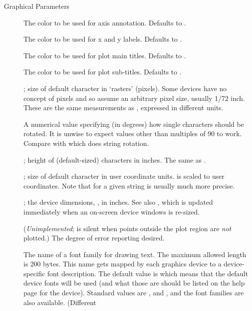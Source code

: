 \begin{Section}{Graphical Parameters}
\begin{description}
\item[] The color to be used for axis
annotation.  Defaults to .
\item[] The color to be used for x and y labels.
Defaults to .
\item[] The color to be used for plot main titles.
Defaults to .
\item[] The color to be used for plot sub-titles.
Defaults to .
\item[] \emph{}; size of default character
 in `rasters' (pixels).  Some devices
have no concept of pixels and so assume an arbitrary pixel size,
usually 1/72 inch.  These are the same measurements
as , expressed in different units.
\item[] A numerical value specifying (in degrees) how
single characters should be rotated.  It is unwise to expect
values other than multiples of 90 to work.  Compare with
 which does string rotation.
\item[] \emph{}; height of (default-sized)
characters in inches.  The same as .
\item[] \emph{}; size of default character
 in user coordinate units.
 is  scaled to user
coordinates.
Note that  for
a given string  is usually much more precise.
\item[] \emph{}; the device dimensions,
, in inches.  See also
, which is updated immediately when an
on-screen device windows is re-sized.
\item[] (\emph{Unimplemented}; \R{} is silent when points
outside the plot region are \emph{not} plotted.)
The degree of error reporting desired.
\item[] The name of a font family for drawing text.
The maximum allowed length is 200 bytes.
This name gets mapped by each graphics device to a device-specific
font description.  The default value is  which means that
the default device fonts will be used (and what those are should
be listed on the help page for the device).  Standard values are
,  and , and the
 font families are also available.  (Different

\end{description}
\end{Section}
